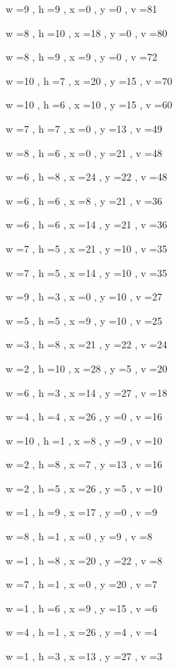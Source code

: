 \documentclass[11pt]{article}
\begin{document}


w =9 , h =9 , x =0 , y =0 , v =81
\par
w =8 , h =10 , x =18 , y =0 , v =80
\par
w =8 , h =9 , x =9 , y =0 , v =72
\par
w =10 , h =7 , x =20 , y =15 , v =70
\par
w =10 , h =6 , x =10 , y =15 , v =60
\par
w =7 , h =7 , x =0 , y =13 , v =49
\par
w =8 , h =6 , x =0 , y =21 , v =48
\par
w =6 , h =8 , x =24 , y =22 , v =48
\par
w =6 , h =6 , x =8 , y =21 , v =36
\par
w =6 , h =6 , x =14 , y =21 , v =36
\par
w =7 , h =5 , x =21 , y =10 , v =35
\par
w =7 , h =5 , x =14 , y =10 , v =35
\par
w =9 , h =3 , x =0 , y =10 , v =27
\par
w =5 , h =5 , x =9 , y =10 , v =25
\par
w =3 , h =8 , x =21 , y =22 , v =24
\par
w =2 , h =10 , x =28 , y =5 , v =20
\par
w =6 , h =3 , x =14 , y =27 , v =18
\par
w =4 , h =4 , x =26 , y =0 , v =16
\par
w =10 , h =1 , x =8 , y =9 , v =10
\par
w =2 , h =8 , x =7 , y =13 , v =16
\par
w =2 , h =5 , x =26 , y =5 , v =10
\par
w =1 , h =9 , x =17 , y =0 , v =9
\par
w =8 , h =1 , x =0 , y =9 , v =8
\par
w =1 , h =8 , x =20 , y =22 , v =8
\par
w =7 , h =1 , x =0 , y =20 , v =7
\par
w =1 , h =6 , x =9 , y =15 , v =6
\par
w =4 , h =1 , x =26 , y =4 , v =4
\par
w =1 , h =3 , x =13 , y =27 , v =3
\par
\newpage
\end{document}
